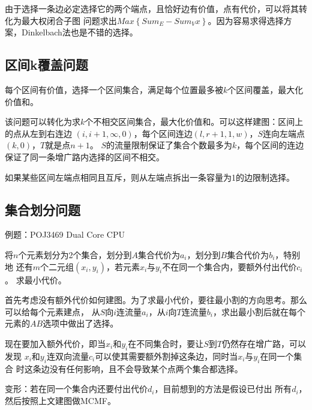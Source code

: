 由于选择一条边必定选择它的两个端点，且恰好边有价值，点有代价，可以将其转化为最大权闭合子图
问题求出$Max\left\{Sum_E-Sum_Vx\right\}$。因为容易求得选择方案，Dinkelbach法也是不错的选择。

\subsection{区间k覆盖问题}
每个区间有价值，选择一个区间集合，满足每个位置最多被$k$个区间覆盖，最大化价值和。

该问题可以转化为求$k$个不相交区间集合，最大化价值和。可以这样建图：区间上的点从左到右连边
$(i,i+1,\infty,0)$，每个区间连边$(l,r+1,1,w)$，$S$连向左端点$(k,0)$，$T$就是点$n+1$。
$S$的流量限制保证了集合个数最多为$k$，每个区间的连边保证了同一条增广路内选择的区间不相交。

如果某些区间左端点相同且互斥，则从左端点拆出一条容量为1的边限制选择。
\subsection{集合划分问题}
例题：POJ3469 Dual Core CPU

将$n$个元素划分为2个集合，划分到$A$集合代价为$a_i$，划分到$B$集合代价为$b_i$，特别地
还有$m$个二元组$(x_i,y_i)$，若元素$x_i$与$y_i$不在同一个集合内，要额外付出代价$c_i$。
求最小代价。

首先考虑没有额外代价如何建图。为了求最小代价，要往最小割的方向思考。那么可以给每个元素建点，
从$S$向$i$连流量$a_i$，从$i$向$T$连流量$b_i$，求出最小割后就在每个元素的$AB$选项中做出了选择。

现在要加入额外代价，即当$x_i$和$y_i$在不同集合时，要让$S$到$T$仍然存在增广路，可以发现
$x_i$和$y_i$连双向流量$c_i$可以使其需要额外割掉这条边，同时当$x_i$与$y_i$在同一个集合
时这条边没有任何影响，且不会导致某个点两个集合都选择。

变形：若在同一个集合内还要付出代价$d_i$，目前想到的方法是假设已付出
所有$d_i$，然后按照上文建图做MCMF。
